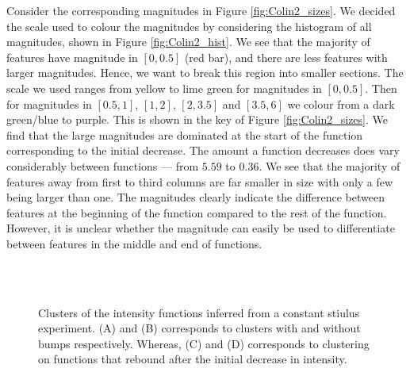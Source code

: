 \documentclass[12pt]{book} %
\begin{document}
Consider the corresponding magnitudes in Figure \ref{fig:Colin2_sizes}. We decided the scale used to colour the magnitudes by considering the histogram of all magnitudes, shown in Figure \ref{fig:Colin2_hist}. We see that the majority of features have magnitude in $[0,0.5]$ (red bar), and there are less features with larger magnitudes. Hence, we want to break this region into smaller sections. The scale we used ranges from yellow to lime green for magnitudes in $[0,0.5]$. Then for magnitudes in $[0.5,1]$, $[1,2]$, $[2,3.5]$ and $[3.5,6]$ we colour from a dark green/blue to purple. This is shown in the key of Figure \ref{fig:Colin2_sizes}. We find that the large magnitudes are dominated at the start of the function corresponding to the initial decrease. The amount a function decreases does vary considerably between functions --- from $5.59$ to $0.36$. We see that the majority of features away from first to third columns are far smaller in size with only a few being larger than one. The magnitudes clearly indicate the difference between features at the beginning of the function compared to the rest of the function. However, it is unclear whether the magnitude can easily be used to differentiate between features in the middle and end of functions.


 \begin{figure}[b!]
   \hrulefill
   \begin{center} 
     \quad
      \\ 
      
          \quad
      \\
    \end{center}     
    \caption{Clusters of the intensity functions inferred from a constant stiulus experiment. (A) and (B) corresponds to clusters with and without bumps respectively. Whereas, (C) and (D) corresponds to clustering on functions that rebound after the initial decrease in intensity. }
    \label{fig:Colin2_Clus}
    \hrulefill
    \end{figure}
    
\end{document}
